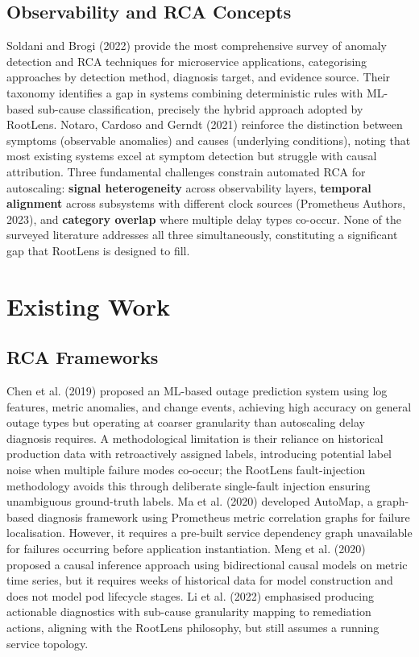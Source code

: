 \subsection{Observability and RCA Concepts}
Soldani and Brogi (2022) provide the most comprehensive survey of anomaly detection and RCA techniques for microservice applications, categorising approaches by detection method, diagnosis target, and evidence source. Their taxonomy identifies a gap in systems combining deterministic rules with ML-based sub-cause classification, precisely the hybrid approach adopted by RootLens. Notaro, Cardoso and Gerndt (2021) reinforce the distinction between symptoms (observable anomalies) and causes (underlying conditions), noting that most existing systems excel at symptom detection but struggle with causal attribution. Three fundamental challenges constrain automated RCA for autoscaling: \textbf{signal heterogeneity} across observability layers, \textbf{temporal alignment} across subsystems with different clock sources (Prometheus Authors, 2023), and \textbf{category overlap} where multiple delay types co-occur. None of the surveyed literature addresses all three simultaneously, constituting a significant gap that RootLens is designed to fill.

\section{Existing Work}

\subsection{RCA Frameworks}
Chen et al. (2019) proposed an ML-based outage prediction system using log features, metric anomalies, and change events, achieving high accuracy on general outage types but operating at coarser granularity than autoscaling delay diagnosis requires. A methodological limitation is their reliance on historical production data with retroactively assigned labels, introducing potential label noise when multiple failure modes co-occur; the RootLens fault-injection methodology avoids this through deliberate single-fault injection ensuring unambiguous ground-truth labels. Ma et al. (2020) developed AutoMap, a graph-based diagnosis framework using Prometheus metric correlation graphs for failure localisation. However, it requires a pre-built service dependency graph unavailable for failures occurring before application instantiation. Meng et al. (2020) proposed a causal inference approach using bidirectional causal models on metric time series, but it requires weeks of historical data for model construction and does not model pod lifecycle stages. Li et al. (2022) emphasised producing actionable diagnostics with sub-cause granularity mapping to remediation actions, aligning with the RootLens philosophy, but still assumes a running service topology.

